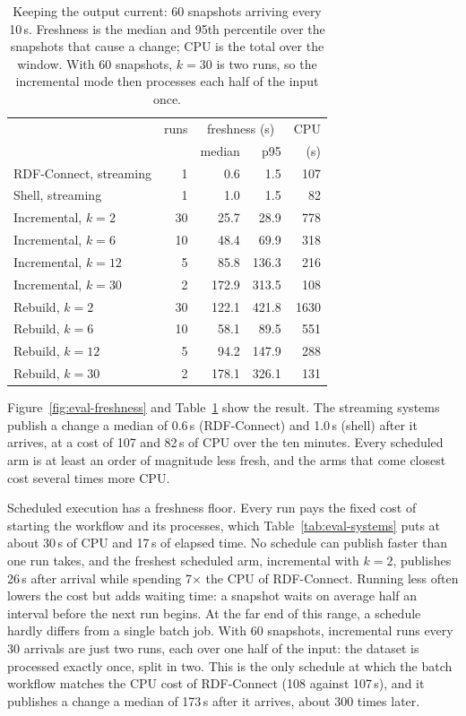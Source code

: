 \begin{table}[t]
\caption{Keeping the output current: 60 snapshots arriving every 10\,s.
Freshness is the median and 95th percentile over the snapshots that cause a
change; CPU is the total over the window. With 60 snapshots, $k=30$ is two
runs, so the incremental mode then processes each half of the input once.}
\label{tab:eval-fresh}
\setlength{\tabcolsep}{4pt}
\begin{tabular}{lrrrr}
\toprule
 & runs & \multicolumn{2}{c}{freshness (s)} & CPU \\
 & & median & p95 & (s) \\
\midrule
RDF-Connect, streaming & 1  & 0.6   & 1.5   & 107 \\
Shell, streaming       & 1  & 1.0   & 1.5   & 82 \\
\midrule
Incremental, $k=2$     & 30 & 25.7  & 28.9  & 778 \\
Incremental, $k=6$     & 10 & 48.4  & 69.9  & 318 \\
Incremental, $k=12$    & 5  & 85.8  & 136.3 & 216 \\
Incremental, $k=30$    & 2  & 172.9 & 313.5 & 108 \\
\midrule
Rebuild, $k=2$         & 30 & 122.1 & 421.8 & 1630 \\
Rebuild, $k=6$         & 10 & 58.1  & 89.5  & 551 \\
Rebuild, $k=12$        & 5  & 94.2  & 147.9 & 288 \\
Rebuild, $k=30$        & 2  & 178.1 & 326.1 & 131 \\
\bottomrule
\end{tabular}
\end{table}

Figure~\ref{fig:eval-freshness} and Table~\ref{tab:eval-fresh} show the result.
The streaming systems publish a change a median of 0.6\,s (RDF-Connect) and
1.0\,s (shell) after it arrives, at a cost of 107 and 82\,s of CPU over the ten
minutes. Every scheduled arm is at least an order of magnitude less fresh, and
the arms that come closest cost several times more CPU.

Scheduled execution has a freshness floor. Every run pays the fixed cost of
starting the workflow and its processes, which Table~\ref{tab:eval-systems} puts
at about 30\,s of CPU and 17\,s of elapsed time. No schedule can publish faster
than one run takes, and the freshest scheduled arm, incremental with $k=2$,
publishes 26\,s after arrival while spending 7$\times$ the CPU of RDF-Connect.
Running less often lowers the cost but adds waiting time: a snapshot waits on
average half an interval before the next run begins. At the far end of this
range, a schedule hardly differs from a single batch job. With 60 snapshots,
incremental runs every 30 arrivals are just two runs, each over one half of the
input: the dataset is processed exactly once, split in two. This is the only
schedule at which the batch workflow matches the CPU cost of RDF-Connect (108
against 107\,s), and it publishes a change a median of 173\,s after it arrives,
about 300 times later.

